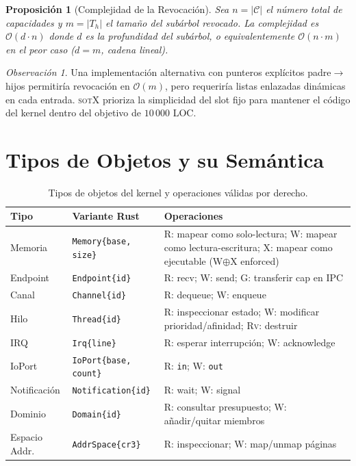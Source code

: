 \documentclass[11pt,twoside,openright]{book}
\theoremstyle{definition}
\theoremstyle{plain}
\newtheorem{proposition}[theorem]{Proposición}
\theoremstyle{remark}
\newtheorem{remark}{Observación}[chapter]
\newcommand{\sotos}{\textsc{sotX}}
\newcommand{\bigO}{\mathcal{O}}
\begin{document}
\begin{proposition}[Complejidad de la Revocación]
\label{prop:revoke-complexity}
Sea $n = |\mathcal{C}|$ el número total de capacidades y $m = |T_h|$ el tamaño del
subárbol revocado. La complejidad es $\bigO(d \cdot n)$ donde $d$ es la profundidad
del subárbol, o equivalentemente $\bigO(n \cdot m)$ en el peor caso ($d = m$, cadena lineal).
\end{proposition}

\begin{remark}
Una implementación alternativa con punteros explícitos padre$\to$hijos permitiría
revocación en $\bigO(m)$, pero requeriría listas enlazadas dinámicas en cada entrada.
\sotos{} prioriza la simplicidad del slot fijo para mantener el código del kernel dentro
del objetivo de $10\,000$ LOC.
\end{remark}

\section{Tipos de Objetos y su Semántica}

\begin{table}[ht]
\centering
\caption{Tipos de objetos del kernel y operaciones válidas por derecho.}
\label{tab:cap-objects}
\begin{tabular}{@{}llp{7cm}@{}}
\toprule
\textbf{Tipo} & \textbf{Variante Rust} & \textbf{Operaciones} \\
\midrule
Memoria & \texttt{Memory\{base, size\}} &
    \textsc{R}: mapear como solo-lectura;
    \textsc{W}: mapear como lectura-escritura;
    \textsc{X}: mapear como ejecutable (W$\oplus$X enforced) \\
Endpoint & \texttt{Endpoint\{id\}} &
    \textsc{R}: recv;
    \textsc{W}: send;
    \textsc{G}: transferir cap en IPC \\
Canal & \texttt{Channel\{id\}} &
    \textsc{R}: dequeue;
    \textsc{W}: enqueue \\
Hilo & \texttt{Thread\{id\}} &
    \textsc{R}: inspeccionar estado;
    \textsc{W}: modificar prioridad/afinidad;
    \textsc{Rv}: destruir \\
IRQ & \texttt{Irq\{line\}} &
    \textsc{R}: esperar interrupción;
    \textsc{W}: acknowledge \\
IoPort & \texttt{IoPort\{base, count\}} &
    \textsc{R}: \texttt{in};
    \textsc{W}: \texttt{out} \\
Notificación & \texttt{Notification\{id\}} &
    \textsc{R}: wait;
    \textsc{W}: signal \\
Dominio & \texttt{Domain\{id\}} &
    \textsc{R}: consultar presupuesto;
    \textsc{W}: añadir/quitar miembros \\
Espacio Addr. & \texttt{AddrSpace\{cr3\}} &
    \textsc{R}: inspeccionar;
    \textsc{W}: map/unmap páginas \\
\bottomrule
\end{tabular}
\end{table}
\end{document}
